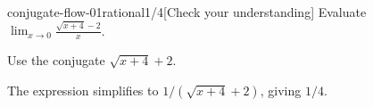 \begin{bgcheck}{conjugate-flow-01}{rational}{1/4}[Check your understanding]
Evaluate \(\lim_{x\to0}\frac{\sqrt{x+4}-2}{x}\).
\begin{bghint}
Use the conjugate \(\sqrt{x+4}+2\).
\end{bghint}
\begin{bgreveal}
The expression simplifies to \(1/(\sqrt{x+4}+2)\), giving \(1/4\).
\end{bgreveal}
\end{bgcheck}
